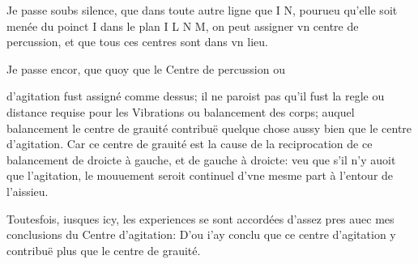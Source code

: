 \documentclass[11pt,a4paper]{article}
\begin{document}
Je passe soubs silence, que dans toute autre ligne que I N, pourueu qu'elle soit menée du poinct I dans le plan I L N M, on peut assigner vn centre de percussion, et que tous ces centres sont dans vn lieu.

Je passe encor, que quoy que le Centre de percussion ou


d'agitation fust assigné comme dessus; il ne paroist pas qu'il fust la regle ou distance requise pour les Vibrations ou balancement des corps; auquel balancement le centre de grauité contribuë quelque chose aussy bien que le centre d'agitation. Car ce centre de grauité est la cause de la reciprocation de ce balancement de droicte à gauche, et de gauche à droicte: veu que s'il n'y auoit que l'agitation, le mouuement seroit continuel d'vne mesme part à l'entour de l'aissieu.

Toutesfois, iusques icy, les experiences se sont accordées d'assez pres auec mes conclusions du Centre d'agitation: D'ou i'ay conclu que ce centre d'agitation y contribuë plus que le centre de grauité.
\end{document}
